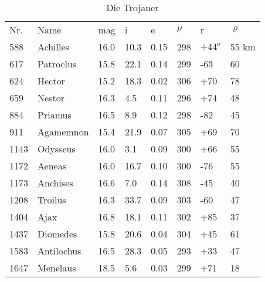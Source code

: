 \begin{table} \centering \begin{tabular}{llllllll} \multicolumn{1}{l}{Nr.} &
\multicolumn{1}{l}{Name} & \multicolumn{1}{l}{mag} & \multicolumn{1}{l}{i} &
\multicolumn{1}{l}{e} & \multicolumn{1}{l}{$ \mu $} & \multicolumn{1}{l}{r} &
\multicolumn{1}{l}{$ \varrho $} \\ \cline{1-8} 
588	& Achilles 	& 16.0	&10.3	& 0.15	& 298	&$+44^o$& 55 km \\
617	& Patroclus	& 15.8	& 22.1	&0.14	& 299	& -63	& 60	\\
624	& Hector 	& 15.2	& 18.3	& 0.02	& 306	& +70	& 78	\\
659	& Nestor	& 16.3	& 4.5 & 0.11	& 296	& +74	& 48	\\
884	& Priamus	& 16.5	& 8.9	& 0.12	& 298 	& -82	& 45	\\
911	& Agamemnon	& 15.4	& 21.9	& 0.07	& 305	& +69	& 70 	\\
1143	& Odysseus	& 16.0	& 3.1	& 0.09	& 300	& +66	& 55	\\
1172 	& Aeneas	& 16.0	&16.7	& 0.10	& 300	& -76	& 55	\\
1173	& Anchises 	& 16.6	& 7.0	& 0.14	& 308	& -45	& 40	\\
1208 	& Troilus	& 16.3	& 33.7	& 0.09	& 303	& -60	& 47	\\
1404	& Ajax	 	& 16.8	& 18.1	& 0.11	& 302	& +85	& 37	\\
1437	& Diomedes 	& 15.8	& 20.6	& 0.04	& 304	& +45	& 61	\\
1583 	& Antilochus	& 16.5	& 28.3	& 0.05	& 293	& +33	& 47	\\
1647 	& Menelaus	& 18.5	& 5.6 & 0.03 	& 299	& +71	& 18	\\
\end{tabular} \caption{Die Trojaner} \label{tab:trojaner} \end{table}

